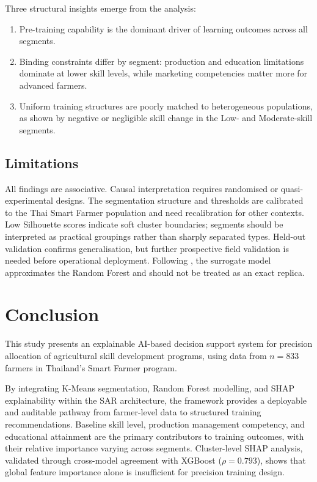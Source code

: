 \documentclass[3p,twocolumn,authoryear]{elsarticle}
\begin{document}
Three structural insights emerge from the analysis:
\begin{enumerate}
  \item Pre-training capability is the dominant driver of learning outcomes
  across all segments.
  \item Binding constraints differ by segment: production and education
  limitations dominate at lower skill levels, while marketing competencies
  matter more for advanced farmers.
  \item Uniform training structures are poorly matched to heterogeneous
  populations, as shown by negative or negligible skill change in the Low-
  and Moderate-skill segments.
\end{enumerate}

\subsection{Limitations}

All findings are associative.
Causal interpretation requires randomised or quasi-experimental designs.
The segmentation structure and thresholds are calibrated to the Thai Smart
Farmer population and need recalibration for other contexts.
Low Silhouette scores indicate soft cluster boundaries; segments should
be interpreted as practical groupings rather than sharply separated types.
Held-out validation confirms generalisation, but further prospective field
validation is needed before operational deployment.
Following \citet{rudin2019}, the surrogate model approximates the Random
Forest and should not be treated as an exact replica.

\section{Conclusion}

This study presents an explainable AI-based decision support system for
precision allocation of agricultural skill development programs, using data
from $n = 833$ farmers in Thailand's Smart Farmer program.

By integrating K-Means segmentation, Random Forest modelling, and SHAP
explainability within the SAR architecture, the framework provides a
deployable and auditable pathway from farmer-level data to structured
training recommendations.
Baseline skill level, production management competency, and educational
attainment are the primary contributors to training outcomes, with their
relative importance varying across segments.
Cluster-level SHAP analysis, validated through cross-model agreement with
XGBoost ($\rho = 0.793$), shows that global feature importance alone is
insufficient for precision training design.
\end{document}
